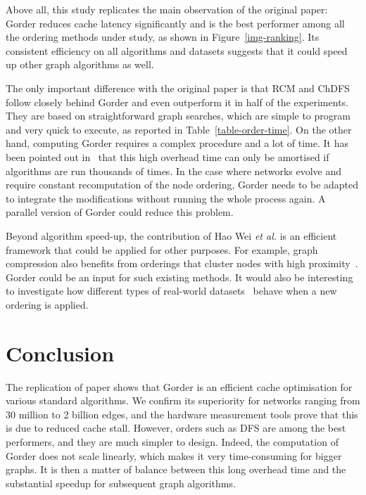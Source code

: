 Above all, this study replicates the main observation of the original paper: Gorder reduces cache latency significantly and is the best performer among all the ordering methods under study, as shown in Figure~\ref{img-ranking}. Its consistent efficiency on all algorithms and datasets suggests that it could speed up other graph algorithms as well.

The only important difference with the original paper is that RCM and ChDFS follow closely behind Gorder and even outperform it in half of the experiments. They are based on straightforward graph searches, which are simple to program and very quick to execute, as reported in Table~\ref{table-order-time}.
%
On the other hand, computing Gorder requires a complex procedure and a lot of time. It has been pointed out in~\cite{overhead} that this high overhead time can only be amortised if algorithms are run thousands of times. In the case where networks evolve and require constant recomputation of the node ordering, Gorder needs to be adapted to integrate the modifications without running the whole process again. A parallel version of Gorder could reduce this problem.

Beyond algorithm speed-up, the contribution of Hao Wei \textit{et al.} is an efficient framework that could be applied for other purposes. For example, graph compression also benefits from orderings that cluster nodes with high proximity~\cite{boldiv}. Gorder could be an input for such existing methods. It would also be interesting to investigate how different types of real-world datasets~\cite{milo} behave when a new ordering is applied. 




\section{Conclusion}

The replication of paper \cite{gorder} shows that Gorder is an efficient cache optimisation for various standard algorithms.
We confirm its superiority for networks ranging from 30 million to 2 billion edges, and the hardware measurement tools prove that this is due to reduced cache stall. However, orders such as DFS are among the best performers, and they are much simpler to design. Indeed, the computation of Gorder does not scale linearly, which makes it very time-consuming for bigger graphs. It is then a matter of balance between this long overhead time and the substantial speedup for subsequent graph algorithms.

